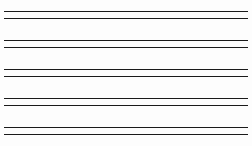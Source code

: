 \documentclass{article}
\begin{document}
\newpage
\noindent{}\rule{1cm}{0.025cm}\framebox{\rule{1cm}{1cm}}

\newpage
\noindent{}\rule{1cm}{0.025cm}

\newpage
\noindent{}\rule{1cm}{0.025cm}

\newpage
\noindent{}\rule{1cm}{0.025cm}

\newpage
\noindent{}\rule{1cm}{0.025cm}

\newpage
\noindent{}\rule{1cm}{0.025cm}

\newpage
\noindent{}\rule{1cm}{0.025cm}

\newpage
\noindent{}\rule{1cm}{0.025cm}

\newpage
\noindent{}\rule{1cm}{0.025cm}

\newpage
\noindent{}\rule{1cm}{0.025cm}

\newpage
\noindent{}\rule{1cm}{0.025cm}

\newpage
\noindent{}\rule{1cm}{0.025cm}

\newpage
\noindent{}\rule{1cm}{0.025cm}

\newpage
\noindent{}\rule{1cm}{0.025cm}

\newpage
\noindent{}\rule{1cm}{0.025cm}

\newpage
\noindent{}\rule{1cm}{0.025cm}\framebox{{\Large $\beta$}}

\newpage
\noindent{}\rule{1cm}{0.025cm}

\newpage
\noindent{}\rule{1cm}{0.025cm}

\newpage
\noindent{}\rule{1cm}{0.025cm}

\newpage
\noindent{}\rule{1cm}{0.025cm}
\end{document}
